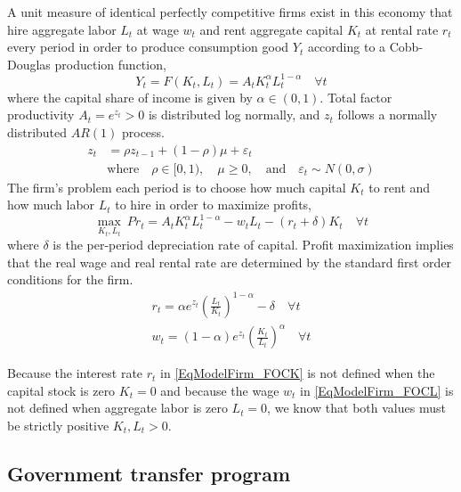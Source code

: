 \documentclass[letterpaper,12pt]{article}
\theoremstyle{definition}
\newcommand\ve{\varepsilon}
\begin{document}
\begin{spacing}{1.5}
    A unit measure of identical perfectly competitive firms exist in this economy that hire aggregate labor $L_t$ at wage $w_t$ and rent aggregate capital $K_t$ at rental rate $r_t$ every period in order to produce consumption good $Y_t$ according to a Cobb-Douglas production function,
    \begin{equation}\label{EqModelFirmProdFunc}
       Y_t = F(K_t, L_t) = A_t K_t^\alpha L_t^{1-\alpha} \quad\forall t
    \end{equation}
    where the capital share of income is given by $\alpha\in(0,1)$. Total factor productivity $A_t = e^{z_t}>0$ is distributed log normally, and $z_t$ follows a normally distributed $AR(1)$ process.
    \begin{equation}\label{EqModelFirmZAR1}
      \begin{split}
        z_t &= \rho z_{t-1} + (1-\rho)\mu + \ve_t \\
        &\text{where}\quad \rho\in[0,1),\quad\mu\geq 0, \quad\text{and}\quad \ve_t \sim N(0,\sigma)
      \end{split}
    \end{equation}
    The firm's problem each period is to choose how much capital $K_t$ to rent and how much labor $L_t$ to hire in order to maximize profits,
    \begin{equation}\label{EqModelFirmProfMax}
      \max_{K_t, L_t}\:Pr_t = A_t K_t^\alpha L_t^{1-\alpha} - w_t L_t - (r_t + \delta)K_t \quad\forall t
    \end{equation}
    where $\delta$ is the per-period depreciation rate of capital. Profit maximization implies that the real wage and real rental rate are determined by the standard first order conditions for the firm.
    \begin{gather}
      r_t = \alpha e^{z_t}\left(\frac{L_t}{K_t}\right)^{1-\alpha} - \delta \quad\forall t \label{EqModelFirm_FOCK} \\
      w_t = (1-\alpha)e^{z_t}\left(\frac{K_t}{L_t}\right)^\alpha \quad\forall t \label{EqModelFirm_FOCL}
    \end{gather}

    Because the interest rate $r_t$ in \eqref{EqModelFirm_FOCK} is not defined when the capital stock is zero $K_t=0$ and because the wage $w_t$ in \eqref{EqModelFirm_FOCL} is not defined when aggregate labor is zero $L_t=0$, we know that both values must be strictly positive $K_t, L_t>0$.


  \subsection{Government transfer program}\label{SecModelGovt}


\end{spacing}
\end{document}
